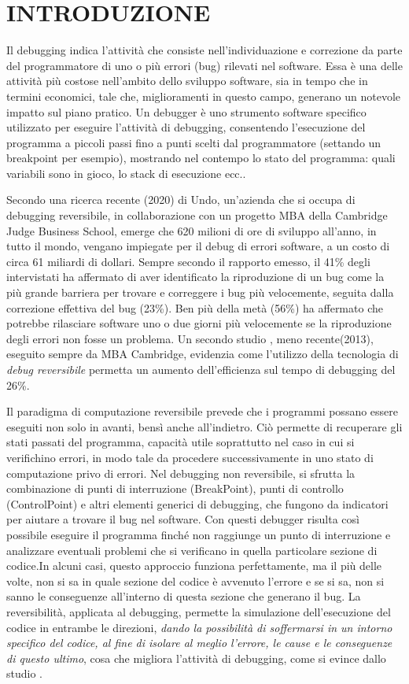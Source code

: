 \documentclass[Tesi.tex]{subfiles}
\begin{document}
\section{INTRODUZIONE}
Il debugging indica l'attività che consiste nell'individuazione e correzione da parte del programmatore di uno o più errori (bug) rilevati nel software.
Essa è una delle attività più costose nell’ambito dello sviluppo software, sia in tempo che in termini economici, tale che, miglioramenti in questo campo, generano un notevole impatto sul piano pratico.
Un debugger è uno strumento software specifico utilizzato per eseguire l'attività di debugging, consentendo l'esecuzione del programma a piccoli passi fino a punti scelti dal programmatore (settando un breakpoint per esempio), mostrando nel contempo lo stato del programma: quali variabili sono in gioco, lo stack di esecuzione ecc..

Secondo una ricerca recente \cite{devops} (2020) di Undo, un'azienda che si occupa di debugging reversibile, in collaborazione con un progetto MBA della Cambridge Judge Business School, emerge che 620 milioni di ore di sviluppo all'anno, in tutto il mondo, vengano impiegate per il debug di errori software, a un costo di circa 61 miliardi di dollari.
Sempre secondo il rapporto emesso, il 41\% degli intervistati ha affermato di aver identificato la riproduzione di un bug come la più grande barriera per trovare e correggere i bug più velocemente, seguita dalla correzione effettiva del bug (23\%). Ben più della metà (56\%) ha affermato che potrebbe rilasciare software uno o due giorni più velocemente se la riproduzione degli errori non fosse un problema. 
Un secondo studio \cite{MBA}, meno recente(2013), eseguito sempre da MBA Cambridge, evidenzia come l’utilizzo della tecnologia di \textit{debug reversibile} permetta un aumento dell'efficienza sul tempo di debugging del 26\%.

Il paradigma di computazione reversibile prevede che i programmi possano essere eseguiti non solo in avanti, bensì anche all'indietro.
Ciò permette di recuperare gli stati passati del programma, capacità utile soprattutto nel caso in cui si verifichino errori, in modo tale da procedere successivamente in uno stato di computazione privo di errori.
Nel debugging non reversibile, si sfrutta la combinazione di punti di interruzione (BreakPoint), punti di controllo (ControlPoint) e altri elementi generici di debugging, che fungono da indicatori per aiutare a trovare il bug nel software. Con questi debugger risulta così possibile eseguire il programma finché non raggiunge un punto di interruzione e analizzare eventuali problemi che si verificano in  quella particolare sezione di codice.In alcuni casi, questo approccio funziona perfettamente, ma il più delle volte, non si sa in quale sezione del codice è avvenuto l'errore e se si sa, non si sanno le conseguenze all'interno di questa sezione che generano il bug.
La reversibilità, applicata al debugging, permette la simulazione dell'esecuzione del codice in entrambe le direzioni, \textit{dando la possibilità di soffermarsi in un intorno specifico del codice, al fine di isolare al meglio l'errore, le cause e le conseguenze di questo ultimo}, cosa che migliora l'attività di debugging, come si evince dallo studio \cite{MBA}.
\end{document}
